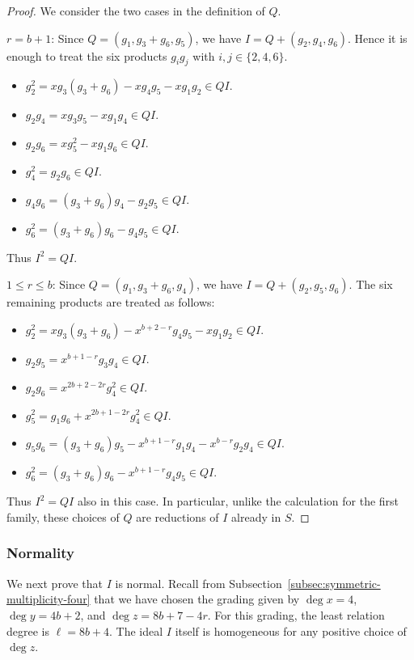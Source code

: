 \begin{proof}
We consider the two cases in the definition of $Q$.

\medskip

\noindent
\underline{$r=b+1$}: Since $Q=(g_1,g_3+g_6,g_5)$, we have
$I=Q+(g_2,g_4,g_6)$.  Hence it is enough to treat the six products
$g_ig_j$ with $i,j\in\{2,4,6\}$.
\begin{itemize}
 \item $g_2^2=xg_3(g_3+g_6)-xg_4g_5-xg_1g_2\in QI$.
 \item $g_2g_4=xg_3g_5-xg_1g_4\in QI$.
 \item $g_2g_6=xg_5^2-xg_1g_6\in QI$.
 \item $g_4^2=g_2g_6\in QI$.
 \item $g_4g_6=(g_3+g_6)g_4-g_2g_5\in QI$.
 \item $g_6^2=(g_3+g_6)g_6-g_4g_5\in QI$.
\end{itemize}
Thus $I^2=QI$.

\medskip

\noindent
\underline{$1\leq r\leq b$}: Since $Q=(g_1,g_3+g_6,g_4)$, we have
$I=Q+(g_2,g_5,g_6)$.  The six remaining products are treated as follows:
\begin{itemize}
 \item
 $g_2^2=xg_3(g_3+g_6)-x^{b+2-r}g_4g_5-xg_1g_2\in QI$.
 \item $g_2g_5=x^{b+1-r}g_3g_4\in QI$.
 \item $g_2g_6=x^{2b+2-2r}g_4^2\in QI$.
 \item $g_5^2=g_1g_6+x^{2b+1-2r}g_4^2\in QI$.
 \item
 $g_5g_6=(g_3+g_6)g_5-x^{b+1-r}g_1g_4-x^{b-r}g_2g_4\in QI$.
 \item $g_6^2=(g_3+g_6)g_6-x^{b+1-r}g_4g_5\in QI$.
\end{itemize}
Thus $I^2=QI$ also in this case.  In particular, unlike the calculation for
the first family, these choices of $Q$ are reductions of $I$ already in $S$.
\end{proof}

\subsubsection{Normality}

We next prove that $I$ is normal.  Recall from
Subsection~\ref{subsec:symmetric-multiplicity-four} that we have chosen the
grading given by $\deg x=4$, $\deg y=4b+2$, and
$\deg z=8b+7-4r$.  For this grading, the least relation degree is
$\ell=8b+4$.  The ideal $I$ itself is homogeneous for any positive choice of
$\deg z$.

